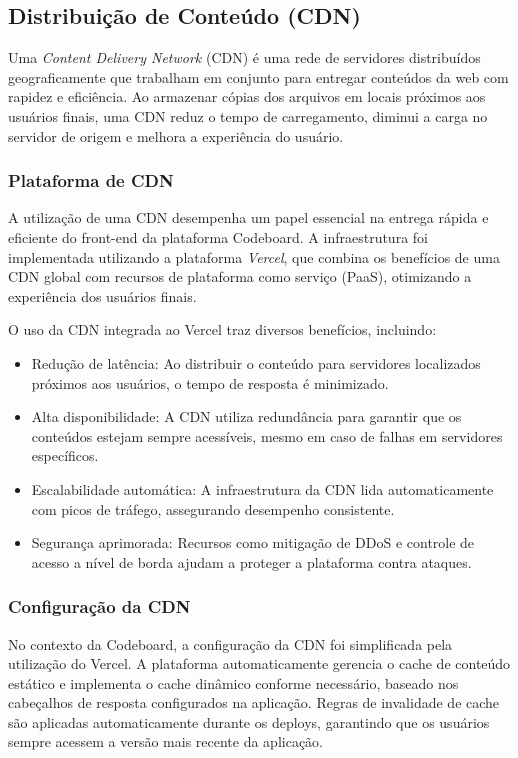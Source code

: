 \subsection{Distribuição de Conteúdo (CDN)}

Uma \emph{Content Delivery Network} (CDN) é uma rede de servidores distribuídos geograficamente que trabalham em conjunto para entregar conteúdos da web com rapidez e eficiência. Ao armazenar cópias dos arquivos em locais próximos aos usuários finais, uma CDN reduz o tempo de carregamento, diminui a carga no servidor de origem e melhora a experiência do usuário.

\subsubsection{Plataforma de CDN}

A utilização de uma CDN desempenha um papel essencial na entrega rápida e eficiente do front-end da plataforma Codeboard. A infraestrutura foi implementada utilizando a plataforma \emph{Vercel}, que combina os benefícios de uma CDN global com recursos de plataforma como serviço (PaaS), otimizando a experiência dos usuários finais.

O uso da CDN integrada ao Vercel traz diversos benefícios, incluindo:

\begin{itemize}
    \item Redução de latência: Ao distribuir o conteúdo para servidores localizados próximos aos usuários, o tempo de resposta é minimizado.
    \item Alta disponibilidade: A CDN utiliza redundância para garantir que os conteúdos estejam sempre acessíveis, mesmo em caso de falhas em servidores específicos.
    \item Escalabilidade automática: A infraestrutura da CDN lida automaticamente com picos de tráfego, assegurando desempenho consistente.
    \item Segurança aprimorada: Recursos como mitigação de DDoS e controle de acesso a nível de borda ajudam a proteger a plataforma contra ataques.
\end{itemize}

\subsubsection{Configuração da CDN}

No contexto da Codeboard, a configuração da CDN foi simplificada pela utilização do Vercel. A plataforma automaticamente gerencia o cache de conteúdo estático e implementa o cache dinâmico conforme necessário, baseado nos cabeçalhos de resposta configurados na aplicação. Regras de invalidade de cache são aplicadas automaticamente durante os deploys, garantindo que os usuários sempre acessem a versão mais recente da aplicação.

